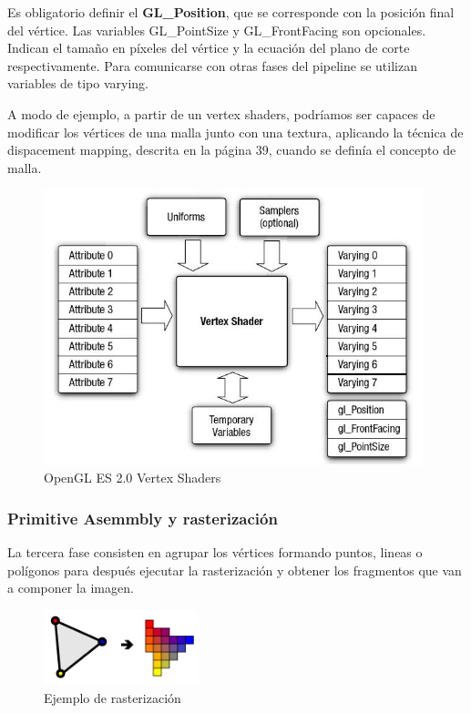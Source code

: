 Es obligatorio definir el \textbf{GL\_Position}, que se corresponde con la posición final del vértice. Las variables GL\_PointSize y GL\_FrontFacing son opcionales. Indican el tamaño en píxeles del vértice y la ecuación del plano de corte respectivamente. Para comunicarse con otras fases del pipeline se utilizan variables de tipo varying.
\newline

A modo de ejemplo, a partir de un vertex shaders, podríamos ser capaces de modificar los vértices de una malla junto con una textura, aplicando la técnica de dispacement mapping, descrita en la página 39, cuando se definía el concepto de malla.

\begin{figure}[H]
\centering
\includegraphics[width=11cm]{img/VertexShader.jpg}
\caption{OpenGL ES 2.0 Vertex Shaders}
\end{figure}

\subsubsection{Primitive Asemmbly y rasterización}

La tercera fase consisten en agrupar los vértices formando puntos, lineas o polígonos para después ejecutar la rasterización y obtener los fragmentos que van a componer la imagen. 

\begin{figure}[!h]
\centering
\includegraphics[width=4.5cm]{img/rasterization.png}
\caption{Ejemplo de rasterización}
\end{figure}

